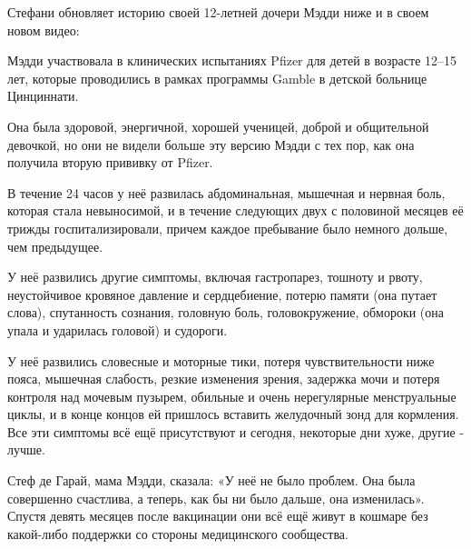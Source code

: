Стефани обновляет историю своей 12-летней дочери Мэдди ниже и в своем новом
видео:

Мэдди участвовала в клинических испытаниях Pfizer для детей в возрасте 12–15
лет, которые проводились в рамках программы Gamble в детской больнице
Цинциннати.

Она была здоровой, энергичной, хорошей ученицей, доброй и общительной девочкой,
но они не видели больше эту версию Мэдди с тех пор, как она получила вторую
прививку от Pfizer.

В течение 24 часов у неё развилась абдоминальная, мышечная и нервная боль,
которая стала невыносимой, и в течение следующих двух с половиной месяцев её
трижды госпитализировали, причем каждое пребывание было немного дольше, чем
предыдущее.

У неё развились другие симптомы, включая гастропарез, тошноту и рвоту,
неустойчивое кровяное давление и сердцебиение, потерю памяти (она путает слова),
спутанность сознания, головную боль, головокружение, обмороки (она упала и
ударилась головой) и судороги.

У неё развились словесные и моторные тики, потеря чувствительности ниже пояса,
мышечная слабость, резкие изменения зрения, задержка мочи и потеря контроля над
мочевым пузырем, обильные и очень нерегулярные менструальные циклы, и в конце
концов ей пришлось вставить желудочный зонд для кормления. Все эти симптомы всё
ещё присутствуют и сегодня, некоторые дни хуже, другие - лучше.

Стеф де Гарай, мама Мэдди, сказала: «У неё не было проблем. Она была совершенно
счастлива, а теперь, как бы ни было дальше, она изменилась».  Спустя девять
месяцев после вакцинации они всё ещё живут в кошмаре без какой-либо поддержки со
стороны медицинского сообщества.
